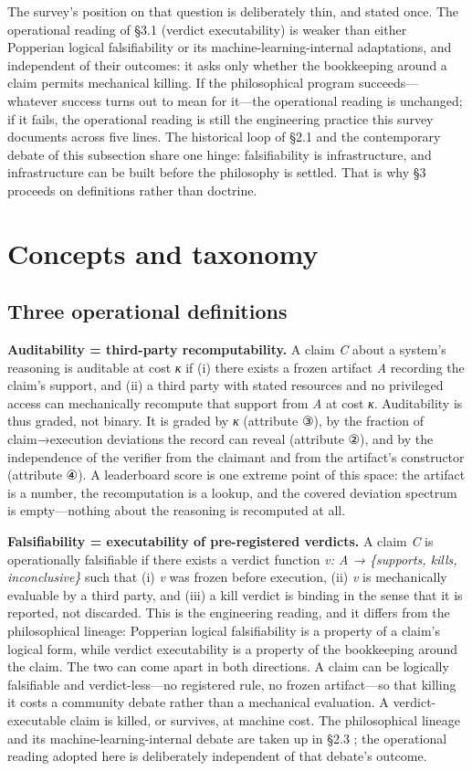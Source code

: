 \documentclass[11pt,a4paper]{article}
\begin{document}
The survey's position on that question is deliberately thin, and stated once. The operational reading of §3.1 (verdict executability) is weaker than either Popperian logical falsifiability or its machine-learning-internal adaptations, and independent of their outcomes: it asks only whether the bookkeeping around a claim permits mechanical killing. If the philosophical program succeeds—whatever success turns out to mean for it—the operational reading is unchanged; if it fails, the operational reading is still the engineering practice this survey documents across five lines. The historical loop of §2.1 and the contemporary debate of this subsection share one hinge: falsifiability is infrastructure, and infrastructure can be built before the philosophy is settled. That is why §3 proceeds on definitions rather than doctrine.

\section{Concepts and taxonomy}

\subsection{Three operational definitions}

\textbf{Auditability = third-party recomputability.} A claim \textit{C} about a system's reasoning is auditable at cost \textit{κ} if (i) there exists a frozen artifact \textit{A} recording the claim's support, and (ii) a third party with stated resources and no privileged access can mechanically recompute that support from \textit{A} at cost \textit{κ}. Auditability is thus graded, not binary. It is graded by \textit{κ} (attribute ③), by the fraction of claim→execution deviations the record can reveal (attribute ②), and by the independence of the verifier from the claimant and from the artifact's constructor (attribute ④). A leaderboard score is one extreme point of this space: the artifact is a number, the recomputation is a lookup, and the covered deviation spectrum is empty—nothing about the reasoning is recomputed at all.

\textbf{Falsifiability = executability of pre-registered verdicts.} A claim \textit{C} is operationally falsifiable if there exists a verdict function \textit{v: A → \{supports, kills, inconclusive\}} such that (i) \textit{v} was frozen before execution, (ii) \textit{v} is mechanically evaluable by a third party, and (iii) a kill verdict is binding in the sense that it is reported, not discarded. This is the engineering reading, and it differs from the philosophical lineage: Popperian logical falsifiability is a property of a claim's logical form, while verdict executability is a property of the bookkeeping around the claim. The two can come apart in both directions. A claim can be logically falsifiable and verdict-less—no registered rule, no frozen artifact—so that killing it costs a community debate rather than a mechanical evaluation. A verdict-executable claim is killed, or survives, at machine cost. The philosophical lineage and its machine-learning-internal debate are taken up in §2.3 \cite{key24,key25}; the operational reading adopted here is deliberately independent of that debate's outcome.
\end{document}
